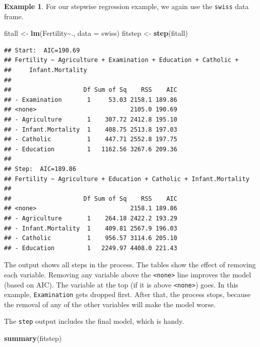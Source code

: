 \documentclass[
]{book}
\newenvironment{Shaded}{\begin{snugshade}}{\end{snugshade}}
\newcommand{\AttributeTok}[1]{\textcolor[rgb]{0.13,0.29,0.53}{#1}}
\newcommand{\FunctionTok}[1]{\textcolor[rgb]{0.13,0.29,0.53}{\textbf{#1}}}
\newcommand{\NormalTok}[1]{#1}
\newcommand{\OtherTok}[1]{\textcolor[rgb]{0.56,0.35,0.01}{#1}}
\newcommand{\SpecialCharTok}[1]{\textcolor[rgb]{0.81,0.36,0.00}{\textbf{#1}}}
\theoremstyle{definition}
\theoremstyle{definition}
\newtheorem{example}{Example}[chapter]
\theoremstyle{definition}
\theoremstyle{definition}
\theoremstyle{remark}
\begin{document}
\begin{examplebox}

\begin{example}
For our stepwise regression example, we again use the \texttt{swiss} data frame.

\begin{Shaded}
\begin{Highlighting}[]
\NormalTok{fitall }\OtherTok{\textless{}{-}} \FunctionTok{lm}\NormalTok{(Fertility}\SpecialCharTok{\textasciitilde{}}\NormalTok{., }\AttributeTok{data =}\NormalTok{ swiss)}
\NormalTok{fitstep }\OtherTok{\textless{}{-}} \FunctionTok{step}\NormalTok{(fitall)}
\end{Highlighting}
\end{Shaded}

\begin{verbatim}
## Start:  AIC=190.69
## Fertility ~ Agriculture + Examination + Education + Catholic + 
##     Infant.Mortality
## 
##                    Df Sum of Sq    RSS    AIC
## - Examination       1     53.03 2158.1 189.86
## <none>                          2105.0 190.69
## - Agriculture       1    307.72 2412.8 195.10
## - Infant.Mortality  1    408.75 2513.8 197.03
## - Catholic          1    447.71 2552.8 197.75
## - Education         1   1162.56 3267.6 209.36
## 
## Step:  AIC=189.86
## Fertility ~ Agriculture + Education + Catholic + Infant.Mortality
## 
##                    Df Sum of Sq    RSS    AIC
## <none>                          2158.1 189.86
## - Agriculture       1    264.18 2422.2 193.29
## - Infant.Mortality  1    409.81 2567.9 196.03
## - Catholic          1    956.57 3114.6 205.10
## - Education         1   2249.97 4408.0 221.43
\end{verbatim}

The output shows all steps in the process. The tables show the effect of removing each variable. Removing any variable above the \texttt{\textless{}none\textgreater{}} line improves the model (based on AIC). The variable at the top (if it is above \texttt{\textless{}none\textgreater{}}) goes. In this example, \texttt{Examination} gets dropped first. After that, the process stops, because the removal of any of the other variables will make the model worse.

The \texttt{step} output includes the final model, which is handy.

\begin{Shaded}
\begin{Highlighting}[]
\FunctionTok{summary}\NormalTok{(fitstep)}
\end{Highlighting}
\end{Shaded}


\end{example}
\end{examplebox}
\end{document}
